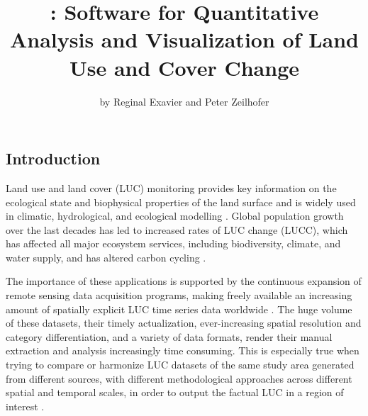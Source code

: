 \title{: Software for Quantitative Analysis and Visualization of Land
Use and Cover Change}
\author{by Reginal Exavier and Peter Zeilhofer}

\maketitle


\hypertarget{introduction}{%
\subsection{Introduction}\label{introduction}}

Land use and land cover (LUC) monitoring provides key information on the
ecological state and biophysical properties of the land surface and is
widely used in climatic, hydrological, and ecological modelling
\citep{Brovkin2013, Verburg2015}. Global population growth over the last
decades has led to increased rates of LUC change (LUCC), which has
affected all major ecosystem services, including biodiversity, climate,
and water supply, and has altered carbon cycling
\citep{Ballantyne2015, Nelson2010, Song2018}.

The importance of these applications is supported by the continuous
expansion of remote sensing data acquisition programs, making freely
available an increasing amount of spatially explicit LUC time series
data worldwide \citep{Prestele2016}. The huge volume of these datasets,
their timely actualization, ever-increasing spatial resolution and
category differentiation, and a variety of data formats, render their
manual extraction and analysis increasingly time consuming. This is
especially true when trying to compare or harmonize LUC datasets of the
same study area generated from different sources, with different
methodological approaches across different spatial and temporal scales,
in order to output the factual LUC in a region of interest
\citep{Yang2017}.

